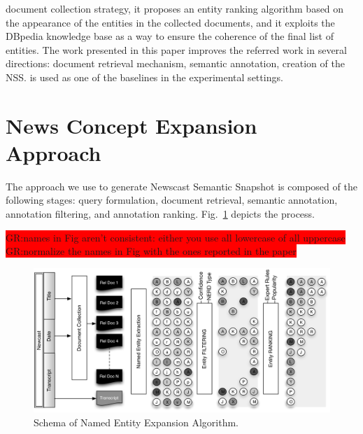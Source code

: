\documentclass{llncs}
\newcommand{\hg}[1]{\colorbox{yellow}{#1}}
\newcommand{\todo}[1]{\colorbox{red}{#1}}
\begin{document}
document collection strategy, it proposes an entity ranking algorithm based on the appearance of the entities in the collected documents, and it exploits the DBpedia knowledge base as a way to ensure the coherence of the final list of entities. The work presented in this paper improves the referred work in several directions: document retrieval mechanism, semantic annotation, creation of the NSS. \cite{RedondoGarcia2014} is used as one of the baselines in the experimental settings.%

\section{News Concept Expansion Approach}
\label{sec:Approach}
The approach we use to generate Newscast Semantic Snapshot is composed of the following stages: query formulation, document retrieval, semantic annotation, annotation filtering, and annotation ranking. Fig.~\ref{fig:namedEntityExpansion} depicts the process.

\todo{GR:names in Fig aren't consistent: either you use all lowercase of all uppercase}
\todo{GR:normalize the names in Fig with the ones reported in the paper}
\begin{figure}[h!]
\centering
\includegraphics[width=1\textwidth]{figure/ExpansionDiagram}
\caption{Schema of Named Entity Expansion Algorithm.}
\label{fig:namedEntityExpansion}%
\end{figure}
\end{document}
